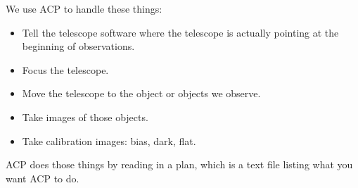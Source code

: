 \documentclass[letterpaper, 12pt]{report}
\begin{document}
We use ACP to handle these things:

\begin{itemize}
	\item Tell the telescope software where the telescope is actually pointing at the beginning of observations.
	\item Focus the telescope.
	\item Move the telescope to the object or objects we observe.
	\item Take images of those objects.
	\item Take calibration images: bias, dark, flat.
\end{itemize}

ACP does those things by reading in a plan, which is a text file listing what you want ACP to do.



\end{document}
